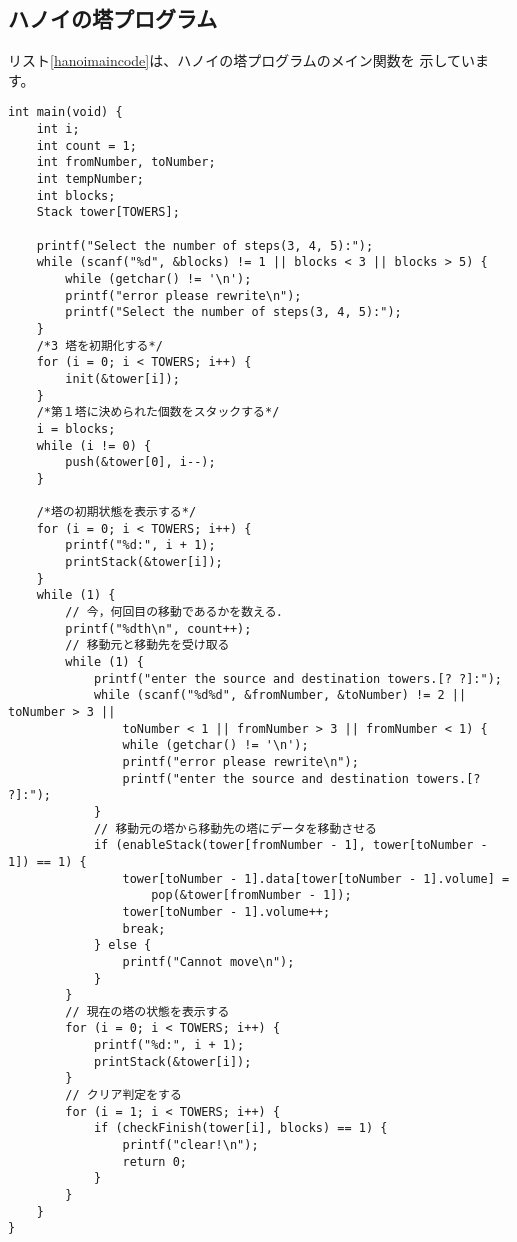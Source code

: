 \documentclass[a4j]{jarticle}
\begin{document}
\subsection{ハノイの塔プログラム}
リスト\ref{hanoimaincode}は、ハノイの塔プログラムのメイン関数を
示しています。
\begin{lstlisting}[caption=ハノイの塔のメイン関数,label=hanoimaincode]
  int main(void) {
    int i;
    int count = 1;
    int fromNumber, toNumber;
    int tempNumber;
    int blocks;
    Stack tower[TOWERS];

    printf("Select the number of steps(3, 4, 5):");
    while (scanf("%d", &blocks) != 1 || blocks < 3 || blocks > 5) {
        while (getchar() != '\n');
        printf("error please rewrite\n");
        printf("Select the number of steps(3, 4, 5):");
    }
    /*3 塔を初期化する*/
    for (i = 0; i < TOWERS; i++) {
        init(&tower[i]);
    }
    /*第１塔に決められた個数をスタックする*/
    i = blocks;
    while (i != 0) {
        push(&tower[0], i--);
    }

    /*塔の初期状態を表示する*/
    for (i = 0; i < TOWERS; i++) {
        printf("%d:", i + 1);
        printStack(&tower[i]);
    }
    while (1) {
        // 今，何回目の移動であるかを数える．
        printf("%dth\n", count++);
        // 移動元と移動先を受け取る
        while (1) {
            printf("enter the source and destination towers.[? ?]:");
            while (scanf("%d%d", &fromNumber, &toNumber) != 2 || toNumber > 3 ||
                toNumber < 1 || fromNumber > 3 || fromNumber < 1) {
                while (getchar() != '\n');
                printf("error please rewrite\n");
                printf("enter the source and destination towers.[? ?]:");
            }
            // 移動元の塔から移動先の塔にデータを移動させる
            if (enableStack(tower[fromNumber - 1], tower[toNumber - 1]) == 1) {
                tower[toNumber - 1].data[tower[toNumber - 1].volume] =
                    pop(&tower[fromNumber - 1]);
                tower[toNumber - 1].volume++;
                break;
            } else {
                printf("Cannot move\n");
            }
        }
        // 現在の塔の状態を表示する
        for (i = 0; i < TOWERS; i++) {
            printf("%d:", i + 1);
            printStack(&tower[i]);
        }
        // クリア判定をする
        for (i = 1; i < TOWERS; i++) {
            if (checkFinish(tower[i], blocks) == 1) {
                printf("clear!\n");
                return 0;
            }
        }
    }
}
\end{lstlisting}
\end{document}
